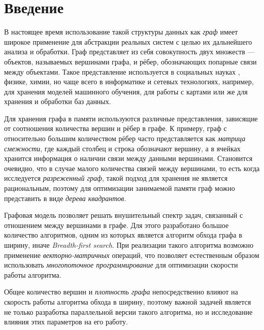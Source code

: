 
\section*{Введение}
\thispagestyle{withCompileDate}

В настоящее время использование такой структуры данных как \textit{граф} имеет широкое применение для абстракции реальных систем с целью их дальнейшего анализа и обработки. Граф представляет из себя совокупность двух множеств --- объектов, называемых вершинами графа, и рёбер, обозначающих попарные связи между объектами. Такое представление используется в социальных науках , физике, химии, но чаще всего в информатике и сетевых технологиях, например, для хранения моделей машинного обучения, для работы с картами или же для хранения и обработки баз данных.

Для хранения графа в памяти используются различные представления, зависящие от соотношения количества вершин и рёбер в графе. К примеру, граф с относительно большим количеством рёбер часто представляется как \textit{матрица смежности}, где каждый столбец и строка обозначают вершину, а в ячейках хранится информация о наличии связи между данными вершинами. Становится очевидно, что в случае малого количества связей между вершинами, то есть когда исследуется \textit{разреженный граф}, такой подход для хранения не является рациональным, поэтому для оптимизации занимаемой памяти граф можно представить в виде \textit{дерева квадрантов}.

Графовая модель позволяет решать внушительный спектр задач, связанный с отношением между вершинами в графе. Для этого разработано большое количество алгоритмов, одним из которых является алгоритм обхода графа в ширину, иначе \textit{Breadth-first search}. При реализации такого алгоритма возможно применение \textit{векторно-матричных} операций, что позволяет естественным образом использовать \textit{многопоточное программирование} для оптимизации скорости работы алгоритма.

Общее количество вершин и \textit{плотность графа} непосредственно влияют на скорость работы алгоритма обхода в ширину, поэтому важной задачей является не только разработка параллельной версии такого алгоритма, но и исследование влияния этих параметров на его работу. 

